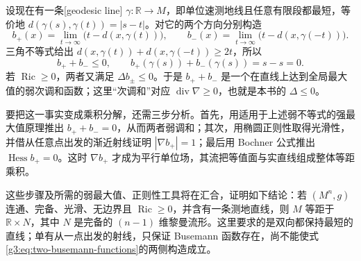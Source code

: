 设现在有一条[geodesic line] \(\gamma:\mathbb R\to M\)，即单位速测地线且任意有限段都最短，等价地 \(d(\gamma(s),\gamma(t))=|s-t|\)。对它的两个方向分别构造
\[
	 b_+(x)=\lim_{t\to\infty}\bigl(t-d(x,\gamma(t))\bigr),\qquad
	 b_-(x)=\lim_{t\to\infty}\bigl(t-d(x,\gamma(-t))\bigr).
\]
三角不等式给出 \(d(x,\gamma(t))+d(x,\gamma(-t))\ge2t\)，所以
\begin{equation}\label{g3:eq:two-busemann-functions}
	 b_++b_-\le0,\qquad
	 b_+(\gamma(s))+b_-(\gamma(s))=s-s=0.
\end{equation}
若 \(\operatorname{Ric}\ge0\)，两者又满足 \(\Delta b_\pm\le0\)。于是 \(b_++b_-\) 是一个在直线上达到全局最大值的弱次调和函数；这里“次调和”对应 \(\operatorname{div}\nabla\ge0\)，也就是本书的 \(\Delta\le0\)。

要把这一事实变成乘积分解，还需三步分析。首先，用适用于上述弱不等式的强最大值原理推出 \(b_++b_-=0\)，从而两者弱调和；其次，用椭圆正则性取得光滑性，并借从任意点出发的渐近射线证明 \(|\nabla b_+|=1\)；最后用 Bochner 公式推出 \(\operatorname{Hess}b_+=0\)。这时 \(\nabla b_+\) 才成为平行单位场，其流把等值面与实直线组成整体等距乘积。

这些步骤及所需的弱最大值、正则性工具将在汇合，证明如下结论：若 \((M^n,g)\) 连通、完备、光滑、无边界且 \(\operatorname{Ric}\ge0\)，并含有一条测地直线，则 \(M\) 等距于 \(\mathbb R\times N\)，其中 \(N\) 是完备的 \((n-1)\) 维黎曼流形。这里要求的是双向都保持最短的直线；单有从一点出发的射线，只保证 Busemann 函数存在，尚不能使式\eqref{g3:eq:two-busemann-functions}的两侧构造成立。
